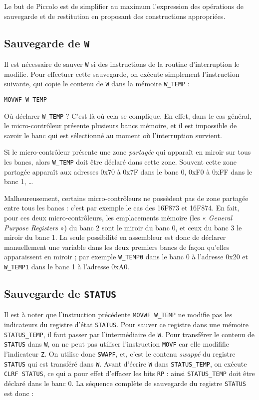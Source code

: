 Le but de Piccolo est de simplifier au maximum l'expression des opérations de sauvegarde et de restitution en proposant des constructions appropriées.

\subsection{Sauvegarde de \texttt{W}}

Il est nécessaire de sauver \texttt{W} si des instructions de la routine d'interruption le modifie. Pour effectuer cette sauvegarde, on exécute simplement l'instruction suivante, qui copie le contenu de \texttt{W} dans la mémoire \texttt{W\_TEMP} :

\begin{lstlisting}[language=assembleur]
MOVWF W_TEMP 
\end{lstlisting}

Où déclarer \texttt{W\_TEMP} ? C'est là où cela se complique. En effet, dans le cas général, le micro-contrôleur présente plusieurs bancs mémoire, et il est impossible de savoir le banc qui est sélectionné au moment où l'interruption survient.

Si le micro-contrôleur présente une zone \emph{partagée} qui apparaît en miroir sur tous les bancs, alors \texttt{W\_TEMP} doit être déclaré dans cette zone. Souvent cette zone partagée apparaît aux adresses 0x70 à 0x7F dans le banc 0, 0xF0 à 0xFF dans le banc 1, …

Malheureusement, certains micro-contrôleurs ne possèdent pas de zone partagée entre tous les bancs : c'est par exemple le cas des 16F873 et 16F874. En fait, pour ces deux micro-contrôleurs, les emplacements mémoire (les « \emph{General Purpose Registers} ») du banc 2 sont le miroir du banc 0, et ceux du banc 3 le miroir du banc 1. La seule possibilité en assembleur est donc de déclarer manuellement une variable dans les deux premiers bancs de façon qu'elles apparaissent en miroir ; par exemple \texttt{W\_TEMP0} dans le banc 0 à l'adresse 0x20 et \texttt{W\_TEMP1} dans le banc 1 à l'adresse 0xA0.


\subsection{Sauvegarde de \texttt{STATUS}}

Il est à noter que l'instruction précédente \texttt{MOVWF W\_TEMP} ne modifie pas les indicateurs du registre d'état \texttt{STATUS}. Pour sauver ce registre dans une mémoire \texttt{STATUS\_TEMP}, il faut passer par l'intermédiaire de \texttt{W}. Pour transférer le contenu de \texttt{STATUS} dans \texttt{W}, on ne peut pas utiliser l'instruction \texttt{MOVF} car elle modififie l'indicateur \texttt{Z}. On utilise donc \texttt{SWAPF}, et, c'est le contenu \emph{swappé} du registre \texttt{STATUS} qui est transféré dans \texttt{W}. Avant d'écrire \texttt{W} dans \texttt{STATUS\_TEMP}, on exécute \texttt{CLRF STATUS}, ce qui a pour effet d'effacer les bits \texttt{RP} : ainsi \texttt{STATUS\_TEMP} doit être déclaré dans le banc 0. La séquence complète de sauvegarde du registre \texttt{STATUS} est donc :


